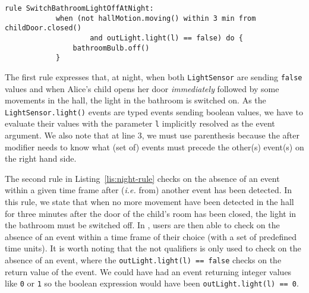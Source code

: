 \begin{description}[leftmargin=0cm]
\begin{lstlisting}[language=iotdsl,label=lis:night-rule,caption=\IOTDSL business rules to switch on\//off the lights at night]
		rule SwitchBathroomLightOffAtNight:	
			when (not hallMotion.moving() within 3 min from childDoor.closed() 
					and outLight.light(l) == false) do {
				bathroomBulb.off()
			}
	\end{lstlisting}
	The first rule expresses that, at night, when both \texttt{LightSensor} are sending \texttt{false} values and when Alice's child opens her door \textit{immediately} followed by some movements in the hall, the light in the bathroom is switched on. As the \texttt{LightSensor.light()} events are typed events sending boolean values, we have to evaluate their values with the parameter \texttt{l} implicitly resolved as the event argument. We also note that at line 3, we must use parenthesis because the \textsf{after} modifier needs to know what (set of) events must precede the other(s) event(s) on the right hand side. 

	The second rule in Listing~\ref{lis:night-rule} checks on the absence of an event \textsf{within} a given time frame after (\textit{i.e.} \textsf{from}) another event has been detected. In this rule, we state that when no more movement have been detected in the hall for three minutes after the door of the child's room has been closed, the light in the bathroom must be switched off. In \IOTDSL, users are then able to check on the absence of an event within a time frame of their choice (with a set of predefined time units). It is worth noting that the \textsf{not} qualifiers is only used to check on the absence of an event, where the \texttt{outLight.light(l) == false} checks on the return value of the event. We could have had an event returning \textsf{integer} values like \texttt{0} or \texttt{1} so the boolean expression would have been \texttt{outLight.light(l) == 0}.


\end{description}
